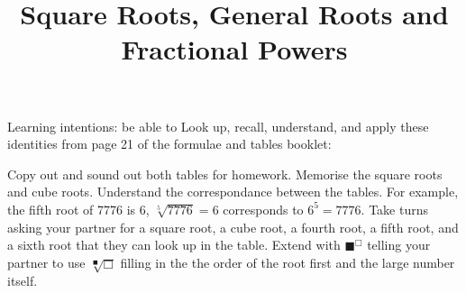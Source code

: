 \documentclass[12pt, a4paper, addpoints]{exam}
\title{Square Roots,  General Roots  and Fractional  Powers}
\date{}
\begin{document}

\maketitle


\large

\begin{questions}
\vspace{-12mm}
\question Learning intentions: be able to Look  up, recall, understand, and apply these identities from page 21 of the formulae and tables booklet:
\large
{}






\question  Copy out and sound out both   tables  for homework.  Memorise the square roots and cube roots. Understand the correspondance between the tables.  For example, the fifth root of 7776 is 6, $\sqrt[5]{7776} = 6$ corresponds to  $6^5 = 7776$. Take turns asking your partner for a square root, a cube root, a fourth root, a fifth root, and a sixth root that they can look up in the table. Extend with \(\blacksquare^{\Box}\) telling your partner to use $\sqrt[\blacksquare]{\Box}$ filling in the the order of the root first and the large number itself.







\end{questions}
\end{document}
